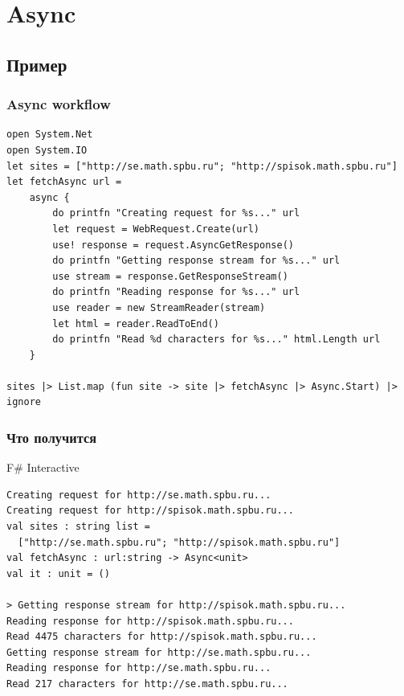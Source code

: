 \documentclass{../../slides-style}
\begin{document}
    
    \frame{\titlepage}

    \section{Async}

    \subsection{Пример}

    \begin{frame}[fragile]
        \frametitle{Async workflow}
        \begin{footnotesize}
            \begin{verbatim}
open System.Net
open System.IO
let sites = ["http://se.math.spbu.ru"; "http://spisok.math.spbu.ru"]
let fetchAsync url =
    async { 
        do printfn "Creating request for %s..." url
        let request = WebRequest.Create(url)
        use! response = request.AsyncGetResponse()
        do printfn "Getting response stream for %s..." url
        use stream = response.GetResponseStream()
        do printfn "Reading response for %s..." url
        use reader = new StreamReader(stream)
        let html = reader.ReadToEnd()
        do printfn "Read %d characters for %s..." html.Length url 
    }

sites |> List.map (fun site -> site |> fetchAsync |> Async.Start) |> ignore
            \end{verbatim}
        \end{footnotesize}
    \end{frame}

    \begin{frame}[fragile]
        \frametitle{Что получится}
        \begin{alertblock}{F\# Interactive}
            \begin{verbatim}
Creating request for http://se.math.spbu.ru...
Creating request for http://spisok.math.spbu.ru...
val sites : string list =
  ["http://se.math.spbu.ru"; "http://spisok.math.spbu.ru"]
val fetchAsync : url:string -> Async<unit>
val it : unit = ()

> Getting response stream for http://spisok.math.spbu.ru...
Reading response for http://spisok.math.spbu.ru...
Read 4475 characters for http://spisok.math.spbu.ru...
Getting response stream for http://se.math.spbu.ru...
Reading response for http://se.math.spbu.ru...
Read 217 characters for http://se.math.spbu.ru...
            \end{verbatim}
        \end{alertblock}
    \end{frame}
\end{document}

